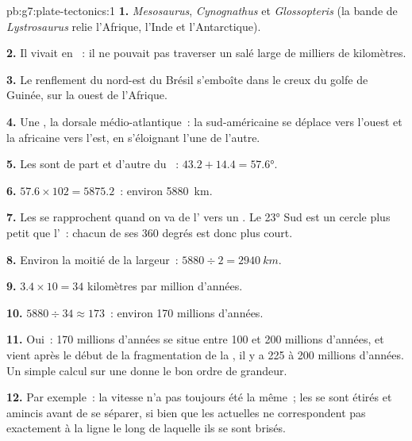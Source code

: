 \begin{solution}{pb:g7:plate-tectonics:1}
\textbf{1.} \emph{Mesosaurus}, \emph{Cynognathus} et \emph{Glossopteris}
(la bande de \emph{Lystrosaurus} relie l'Afrique, l'Inde et
l'Antarctique).

\textbf{2.} Il vivait en ~: il ne pouvait pas traverser un 
salé large de milliers de kilomètres.

\textbf{3.} Le renflement du nord-est du Brésil s'emboîte dans le creux du
golfe de Guinée, sur la  ouest de l'Afrique.

\textbf{4.} Une , la dorsale médio-atlantique~: la 
sud-américaine se déplace vers l'ouest et la  africaine vers l'est,
en s'éloignant l'une de l'autre.

\textbf{5.} Les  sont de part et d'autre du ~:
$43.2 + 14.4 = \ang{57.6}$.

\textbf{6.} $57.6 \times 102 = 5875.2$~: environ \qty{5880}{km}.

\textbf{7.} Les  se rapprochent quand on va de l' vers un
. Le  \ang{23} Sud est un cercle plus petit que l'~:
chacun de ses 360 degrés est donc plus court.

\textbf{8.} Environ la moitié de la largeur~: $5880 \div 2 = \qty{2940}{km}$.

\textbf{9.} $3.4 \times 10 = 34$ kilomètres par million d'années.

\textbf{10.} $5880 \div 34 \approx 173$~: environ 170 millions d'années.

\textbf{11.} Oui~: 170 millions d'années se situe entre 100 et 200 millions
d'années, et vient après le début de la fragmentation de la , il y a
225 à 200 millions d'années. Un simple calcul sur une  donne le bon
ordre de grandeur.

\textbf{12.} Par exemple~: la vitesse n'a pas toujours été la même~; les
 se sont étirés et amincis avant de se séparer, si bien que les
 actuelles ne correspondent pas exactement à la ligne le long de
laquelle ils se sont brisés.
\end{solution}
